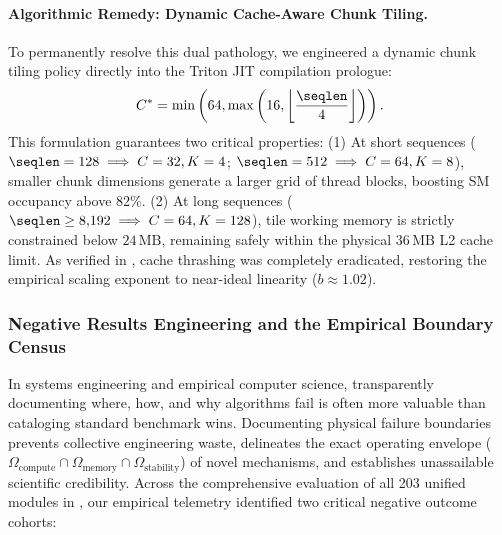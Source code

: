 \paragraph{Algorithmic Remedy: Dynamic Cache-Aware Chunk Tiling.}
To permanently resolve this dual pathology, we engineered a dynamic chunk tiling policy directly into the Triton JIT compilation prologue:
\begin{equation}
    C^* = \min\left(64, \max\left(16, \left\lfloor \frac{\seqlen}{4} \right\rfloor\right)\right).
    \label{eq:dynamic_chunk_tiling}
\end{equation}
This formulation guarantees two critical properties:
(1) At short sequences ($\seqlen = 128 \implies C=32, K=4$; $\seqlen = 512 \implies C=64, K=8$), smaller chunk dimensions generate a larger grid of thread blocks, boosting SM occupancy above $82\%$.
(2) At long sequences ($\seqlen \ge 8{,}192 \implies C=64, K=128$), tile working memory is strictly constrained below $24\,\text{MB}$, remaining safely within the physical $36\,\text{MB}$ L2 cache limit.
As verified in , cache thrashing was completely eradicated, restoring the empirical scaling exponent to near-ideal linearity ($b \approx 1.02$).

\subsubsection{Negative Results Engineering and the Empirical Boundary Census}
\label{subsubsec:negative_results_census}

In systems engineering and empirical computer science, transparently documenting where, how, and why algorithms fail is often more valuable than cataloging standard benchmark wins.
Documenting physical failure boundaries prevents collective engineering waste, delineates the exact operating envelope ($\Omega_{\text{compute}} \cap \Omega_{\text{memory}} \cap \Omega_{\text{stability}}$) of novel mechanisms, and establishes unassailable scientific credibility.
Across the comprehensive evaluation of all 203 unified modules in \neuralops{}, our empirical telemetry identified two critical negative outcome cohorts:

